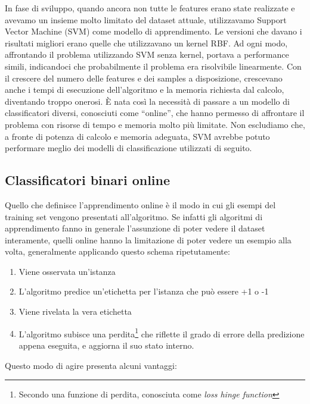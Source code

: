 In fase di sviluppo, quando ancora non tutte le features erano state realizzate e avevamo un insieme molto limitato del dataset attuale, utilizzavamo Support Vector Machine (SVM) come modello di apprendimento. Le versioni che davano i risultati migliori erano quelle che utilizzavano un kernel RBF. Ad ogni modo, affrontando il problema utilizzando SVM senza kernel, portava a performance simili, indicandoci che probabilmente il problema era risolvibile linearmente. Con il crescere del numero delle features e dei samples a disposizione, crescevano anche i tempi di esecuzione dell'algoritmo e la memoria richiesta dal calcolo, diventando troppo onerosi. È nata così la necessità di passare a un modello di classificatori diversi, conosciuti come “online”, che hanno permesso di affrontare il problema con risorse di tempo e memoria molto più limitate. Non escludiamo che, a fronte di potenza di calcolo e memoria adeguata, SVM avrebbe potuto performare meglio dei modelli di classificazione utilizzati di seguito.

\subsection{Classificatori binari online}

Quello che definisce l'apprendimento online è il modo in cui gli esempi del training set vengono presentati all'algoritmo. Se infatti gli algoritmi di apprendimento fanno in generale l'assunzione di poter vedere il dataset interamente, quelli online hanno la limitazione di poter vedere un esempio alla volta, generalmente applicando questo schema ripetutamente:

\begin{enumerate}
	\item Viene osservata un'istanza
	\item L'algoritmo predice un'etichetta per l'istanza che può essere +1 o -1
	\item Viene rivelata la vera etichetta
	\item L'algoritmo subisce una perdita\footnote{Secondo una funzione di perdita, conosciuta come \textit{loss hinge function}} che riflette il grado di errore della predizione appena eseguita, e aggiorna il suo stato interno.
\end{enumerate}


Questo modo di agire presenta alcuni vantaggi:

